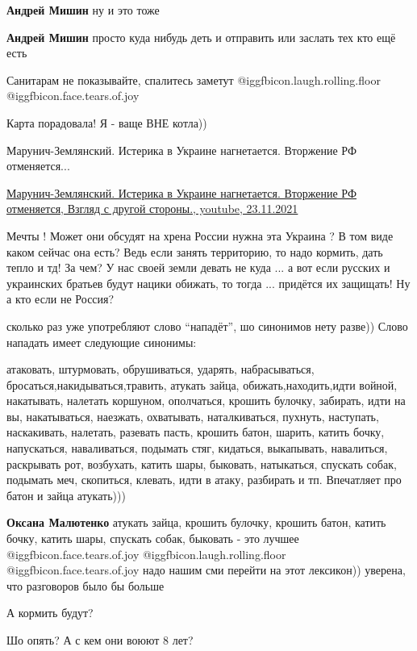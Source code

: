 \begin{itemize}
\begin{itemize}
\textbf{Андрей Мишин} ну и это тоже

\textbf{Андрей Мишин} просто куда нибудь деть и отправить или заслать тех кто ещё есть
\end{itemize} %

Санитарам не показывайте, спалитесь заметут @igg{fbicon.laugh.rolling.floor}  @igg{fbicon.face.tears.of.joy} 

Карта порадовала! Я - ваще ВНЕ котла))

Марунич-Землянский. Истерика в Украине нагнетается. Вторжение РФ отменяется...

\href{https://www.youtube.com/watch?v=f-3D5mHE4Yc}{%
Марунич-Землянский. Истерика в Украине нагнетается. Вторжение РФ отменяется, %
Взгляд с другой стороны., youtube, 23.11.2021%
}


Мечты ! Может они обсудят на хрена России нужна эта Украина ? В том виде каком
сейчас она есть? Ведь если занять территорию, то надо кормить, дать тепло и
тд! За чем? У нас своей земли девать не куда ... а вот если русских и
украинских братьев будут нацики обижать, то тогда ... придётся их защищать! Ну
а кто если не Россия?


сколько раз уже употребляют слово \enquote{нападёт}, шо синонимов нету разве)) Слово
нападать имеет следующие синонимы:

атаковать, штурмовать, обрушиваться, ударять, набрасываться,
бросаться,накидываться,травить, атукать зайца, обижать,находить,идти войной,
накатывать, налетать коршуном, ополчаться, крошить булочку, забирать, идти на
вы, накатываться, наезжать, охватывать, наталкиваться, пухнуть, наступать,
наскакивать, налетать, разевать пасть, крошить батон, шарить, катить бочку,
напускаться, наваливаться, подымать стяг, кидаться, выкапывать, навалиться,
раскрывать рот, возбухать, катить шары, быковать, натыкаться, спускать собак,
подымать меч, скопиться, клевать, идти в атаку, разбирать и тп. Впечатляет про
батон и зайца атукать)))

\begin{itemize} %
\textbf{Оксана Малютенко} атукать зайца, крошить булочку, крошить батон, катить бочку, катить шары, спускать собак, быковать - это лучшее  @igg{fbicon.face.tears.of.joy}  @igg{fbicon.laugh.rolling.floor}  @igg{fbicon.face.tears.of.joy}  надо нашим сми перейти на этот лексикон)) уверена, что разговоров было бы больше
\end{itemize} %

А кормить будут?

Шо опять? А с кем они воюют 8 лет?


\end{itemize} %
